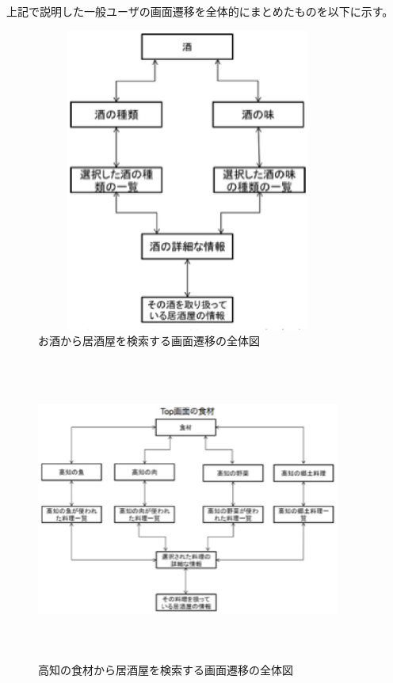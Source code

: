 上記で説明した一般ユーザの画面遷移を全体的にまとめたものを以下に示す。



\begin {figure}[!htbp]
    \begin{center}
    \includegraphics [height=10cm, width=10cm]{19.eps}
    \caption {お酒から居酒屋を検索する画面遷移の全体図}
    \label {fig:19}
    \end{center}
\end {figure}



\begin {figure}[!htbp]
    \begin{center}
    \includegraphics [height=10cm, width=10cm]{20.eps}
    \caption {高知の食材から居酒屋を検索する画面遷移の全体図}
    \label {fig:20}
    \end{center}
\end {figure}


